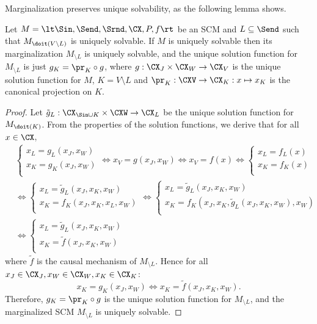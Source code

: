 Marginalization preserves unique solvability, as the following lemma shows.
\begin{Lem}\label{lem:marginalization_preserves_unique_solvability}
  Let $M = \lt \Sin, \Send, \Srnd, \CX, P, f \rt$ be an SCM and $L \subseteq \Send$ such that
  $M_{\doit(V \setminus L)}$ is uniquely solvable.
  If $M$ is uniquely solvable then its marginalization $M_{\setminus L}$ is uniquely solvable, and the unique solution function for
  $M_{\setminus L}$ is just $g_K = \pr_K \circ g$, where $g : \CX_J \times \CX_W \to \CX_V$ is the 
  unique solution function for $M$, $K = V \setminus L$ and $\pr_K : \CXV \to \CX_K : x \mapsto x_K$ is the canonical projection on $K$.
\end{Lem}
\begin{proof}
  Let $\tilde{g}_L : \CX_{\Sin \cup K} \times \CXW \to \CX_L$
  be the unique solution function for $M_{\doit(K)}$.
  From the properties of the solution functions, we derive that
  for all $x \in \CX$,
  \begin{equation*}\begin{split}
  & \begin{cases}
    x_L = g_L(x_J,x_W) \\
    x_K = g_K(x_J,x_W) \\
  \end{cases}
  \iff x_V = g(x_J,x_W) \iff x_V = f(x) 
  \iff \begin{cases}
    x_L = f_L(x) \\
    x_K = f_K(x) \\
  \end{cases} \\
  & \iff \begin{cases}
    x_L = \tilde{g}_L(x_J,x_K,x_W) \\
    x_K = f_K(x_J,x_K,x_L,x_W) \\
  \end{cases}
  \iff \begin{cases}
    x_L = \tilde{g}_L(x_J,x_K,x_W) \\
    x_K = f_K(x_J,x_K,\tilde{g}_L(x_J,x_K,x_W),x_W) \\
  \end{cases} \\
  & \iff \begin{cases}
    x_L = \tilde{g}_L(x_J,x_K,x_W) \\
    x_K = \tilde{f}(x_J,x_K,x_W) \\
  \end{cases}
  \end{split}\end{equation*}
where $\tilde{f}$ is the causal mechanism of $M_{\setminus L}$.
Hence for all $x_J \in \CX_J, x_W \in \CX_W, x_K \in \CX_K$:
$$x_K = g_K(x_J,x_W) \iff x_K = \tilde{f}(x_J,x_K,x_W).$$
Therefore, $g_K = \pr_K \circ g$ is the unique solution function for $M_{\setminus L}$, and the marginalized SCM $M_{\setminus L}$ is uniquely solvable.
\end{proof}
